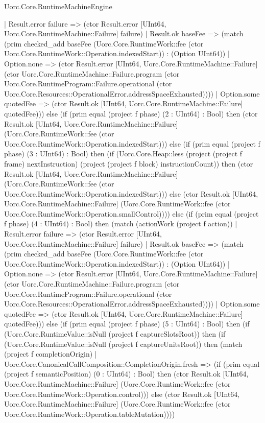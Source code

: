 \begin{lexlean}{Uorc.Core.RuntimeMachineEngine}
\begin{semanticmodule}
{      | Result.error failure => (ctor Result.error [UInt64, Uorc.Core.RuntimeMachine::Failure] failure)
      | Result.ok baseFee => (match (prim checked_add baseFee (Uorc.Core.RuntimeWork::fee (ctor Uorc.Core.RuntimeWork::Operation.indexedStart)) : (Option UInt64))
        | Option.none => (ctor Result.error [UInt64, Uorc.Core.RuntimeMachine::Failure] (ctor Uorc.Core.RuntimeMachine::Failure.program (ctor Uorc.Core.RuntimeProgram::Failure.operational (ctor Uorc.Core.Resources::OperationalError.addressSpaceExhausted))))
        | Option.some quotedFee => (ctor Result.ok [UInt64, Uorc.Core.RuntimeMachine::Failure] quotedFee))) else (if (prim equal (project f phase) (2 : UInt64) : Bool) then (ctor Result.ok [UInt64, Uorc.Core.RuntimeMachine::Failure] (Uorc.Core.RuntimeWork::fee (ctor Uorc.Core.RuntimeWork::Operation.indexedStart))) else (if (prim equal (project f phase) (3 : UInt64) : Bool) then (if (Uorc.Core.Heap::less (project (project f frame) nextInstruction) (project (project f block) instructionCount)) then (ctor Result.ok [UInt64, Uorc.Core.RuntimeMachine::Failure] (Uorc.Core.RuntimeWork::fee (ctor Uorc.Core.RuntimeWork::Operation.indexedStart))) else (ctor Result.ok [UInt64, Uorc.Core.RuntimeMachine::Failure] (Uorc.Core.RuntimeWork::fee (ctor Uorc.Core.RuntimeWork::Operation.smallControl)))) else (if (prim equal (project f phase) (4 : UInt64) : Bool) then (match (actionWork (project f action))
      | Result.error failure => (ctor Result.error [UInt64, Uorc.Core.RuntimeMachine::Failure] failure)
      | Result.ok baseFee => (match (prim checked_add baseFee (Uorc.Core.RuntimeWork::fee (ctor Uorc.Core.RuntimeWork::Operation.indexedStart)) : (Option UInt64))
        | Option.none => (ctor Result.error [UInt64, Uorc.Core.RuntimeMachine::Failure] (ctor Uorc.Core.RuntimeMachine::Failure.program (ctor Uorc.Core.RuntimeProgram::Failure.operational (ctor Uorc.Core.Resources::OperationalError.addressSpaceExhausted))))
        | Option.some quotedFee => (ctor Result.ok [UInt64, Uorc.Core.RuntimeMachine::Failure] quotedFee))) else (if (prim equal (project f phase) (5 : UInt64) : Bool) then (if (Uorc.Core.RuntimeValue::isNull (project f captureSlotsRoot)) then (if (Uorc.Core.RuntimeValue::isNull (project f captureUnitsRoot)) then (match (project f completionOrigin)
      | Uorc.Core.CanonicalCallComposition::CompletionOrigin.fresh => (if (prim equal (project f semanticPosition) (0 : UInt64) : Bool) then (ctor Result.ok [UInt64, Uorc.Core.RuntimeMachine::Failure] (Uorc.Core.RuntimeWork::fee (ctor Uorc.Core.RuntimeWork::Operation.control))) else (ctor Result.ok [UInt64, Uorc.Core.RuntimeMachine::Failure] (Uorc.Core.RuntimeWork::fee (ctor Uorc.Core.RuntimeWork::Operation.tableMutation))))
}
\end{semanticmodule}
\end{lexlean}
